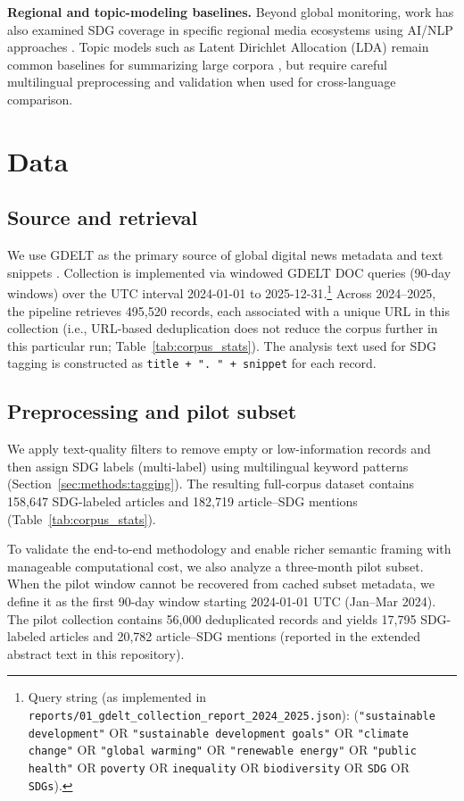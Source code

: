 \documentclass[11pt]{article}
\begin{document}
\textbf{Regional and topic-modeling baselines.} Beyond global monitoring, work has also examined SDG coverage in specific regional media ecosystems using AI/NLP approaches \parencite{alsuhaibani2025ai}. Topic models such as Latent Dirichlet Allocation (LDA) remain common baselines for summarizing large corpora \parencite{blei2003lda}, but require careful multilingual preprocessing and validation when used for cross-language comparison.

\section{Data}
\subsection{Source and retrieval}
We use GDELT as the primary source of global digital news metadata and text snippets \parencite{leetaru2013gdelt,gdelt2015gkgcodebook}. Collection is implemented via windowed GDELT DOC queries (90-day windows) over the UTC interval 2024-01-01 to 2025-12-31.\footnote{Query string (as implemented in \texttt{reports/01\_gdelt\_collection\_report\_2024\_2025.json}): (\texttt{"sustainable development"} OR \texttt{"sustainable development goals"} OR \texttt{"climate change"} OR \texttt{"global warming"} OR \texttt{"renewable energy"} OR \texttt{"public health"} OR \texttt{poverty} OR \texttt{inequality} OR \texttt{biodiversity} OR \texttt{SDG} OR \texttt{SDGs}).}
Across 2024--2025, the pipeline retrieves 495{,}520 records, each associated with a unique URL in this collection (i.e., URL-based deduplication does not reduce the corpus further in this particular run; Table~\ref{tab:corpus_stats}). The analysis text used for SDG tagging is constructed as \texttt{title + ". " + snippet} for each record.

\subsection{Preprocessing and pilot subset}
We apply text-quality filters to remove empty or low-information records and then assign SDG labels (multi-label) using multilingual keyword patterns (Section~\ref{sec:methods:tagging}). The resulting full-corpus dataset contains 158{,}647 SDG-labeled articles and 182{,}719 article--SDG mentions (Table~\ref{tab:corpus_stats}).

To validate the end-to-end methodology and enable richer semantic framing with manageable computational cost, we also analyze a three-month pilot subset. When the pilot window cannot be recovered from cached subset metadata, we define it as the first 90-day window starting 2024-01-01 UTC (Jan--Mar 2024). The pilot collection contains 56{,}000 deduplicated records and yields 17{,}795 SDG-labeled articles and 20{,}782 article--SDG mentions (reported in the extended abstract text in this repository).
\end{document}
